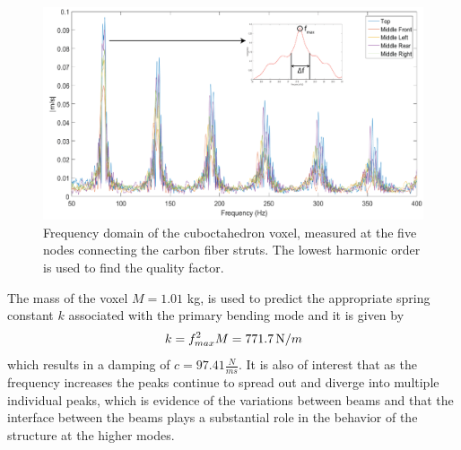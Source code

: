 \documentclass[11pt]{ucthesis}
\begin{document}
\begin{figure}[thpb]
\centering
\includegraphics[width=0.75\linewidth]{Figures/FFTandQ.png}
\caption{Frequency domain of the cuboctahedron voxel, measured at the five nodes connecting the carbon fiber struts. The lowest harmonic order is used to find the quality factor.}
\label{fig:FFTandQ}
\end{figure}
The mass of the voxel $M=1.01$ kg, is used to predict the appropriate spring constant $k$ associated with the primary bending mode and it is given by
\begin{equation}
k = f_{max}^2 M = 771.7 \, {\mbox N/m}
\label{eqn:kfm}
\end{equation}
which results in a damping of $c = 97.41 \frac{N}{ms}$. It is also of interest that as the frequency increases the peaks continue to spread out and diverge into multiple individual peaks, which is evidence of the variations between beams and that the interface between the beams plays a substantial role in the behavior of the structure at the higher modes.
\end{document}
